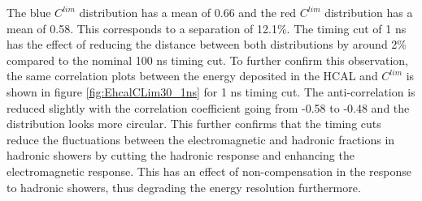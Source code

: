 The blue $C^{lim}$ distribution has a mean of 0.66 and the red $C^{lim}$ distribution has a mean of 0.58. This corresponds to a separation of 12.1\%. The timing cut of 1 ns has the effect of reducing the distance between both distributions by around 2\% compared to the nominal 100 ns timing cut. To further confirm this observation, the same correlation plots between the energy deposited in the HCAL and $C^{lim}$ is shown in figure \ref{fig:EhcalCLim30_1ns} for 1 ns timing cut. The anti-correlation is reduced slightly with the correlation coefficient going from -0.58 to -0.48 and the distribution looks more circular. This further confirms that the timing cuts reduce the fluctuations between the electromagnetic and hadronic fractions in hadronic showers by cutting the hadronic response and enhancing the electromagnetic response. This has an effect of non-compensation in the response to hadronic showers, thus degrading the energy resolution furthermore.

